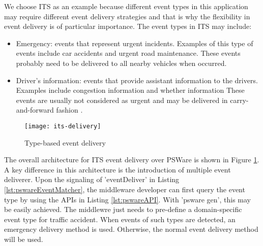 We choose ITS as an example because different event types in this application may require different event delivery strategies and that is why the flexibility in event delivery is of particular importance. The event types in ITS may include:
\begin{itemize}
\item Emergency: events that represent urgent incidents. Examples of this type of events include car accidents and urgent road maintenance. These events probably need to be delivered to all nearby vehicles when occurred.
\item Driver's information: events that provide assistant information to the drivers. Examples include congestion information and whether information These events are usually not considered as urgent and may be delivered in carry-and-forward fashion \cite{cartel}.
\end{itemize}

\begin{figure}
\centering
\texttt{[image: its-delivery]}
\caption{Type-based event delivery}
\label{fig:its-delivery}
\end{figure}

The overall architecture for ITS event delivery over PSWare is shown in Figure \ref{fig:its-delivery}. A key difference in this architecture is the introduction of multiple event deliverer. Upon the signaling of 'eventDeliver' in Listing \ref{lst:pswareEventMatcher}, the middleware developer can first query the event type by using the APIs in Listing \ref{lst:pswareAPI}. With 'psware gen', this may be easily achieved. The middlewre just needs to pre-define a domain-specific event type for traffic accident. When events of such types are detected, an emergency delivery method is used. Otherwise, the normal event delivery method will be used.
